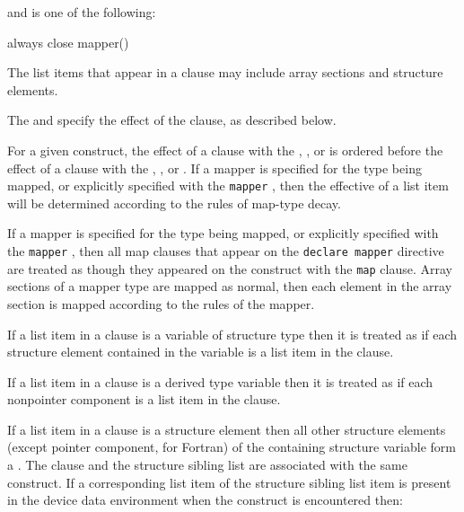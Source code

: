 and  is one of the following:

\begin{indentedcodelist}
always
close
mapper()
\end{indentedcodelist}

\descr
The list items that appear in a  clause may include array sections 
and structure elements.

The  and  specify the effect of the 
 clause, as described below.

For a given construct, the effect of a  clause with the ,
, or   is ordered before the effect of a
 clause with the , , or 
. If a mapper is specified for the type being mapped, or
explicitly specified with the \verb`mapper` , then the
effective  of a list item will be determined according to the
rules of map-type decay.

If a mapper is specified for the type being mapped, or explicitly specified with
the \verb`mapper` , then all map clauses that appear on the
\verb`declare mapper` directive are treated as though they appeared on the
construct with the \verb`map` clause.  Array sections of a mapper type are
mapped as normal, then each element in the array section is mapped according to
the rules of the mapper.

\begin{ccppspecific}
If a list item in a  clause is a variable of structure type then it
is treated as if each structure element contained in the variable is a list
item in the clause.
\end{ccppspecific}

\begin{fortranspecific}
If a list item in a  clause is a derived type variable
then it is treated as if each nonpointer component is a list item in
the clause.
\end{fortranspecific}

If a list item in a  clause is a structure element then all other
structure elements (except pointer component, for Fortran) of the containing 
structure variable form a .  The  clause 
and the structure sibling list are associated with the same construct.  If a 
corresponding list item of the structure sibling list item is present in the 
device data environment when the construct is encountered then:

